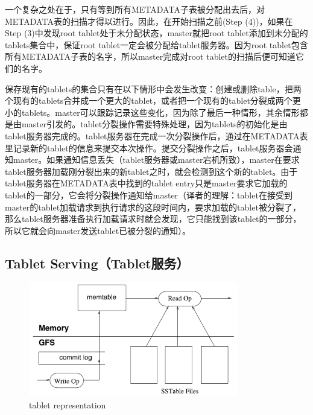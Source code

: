 \documentclass{article}
\begin{document}
\par
一个复杂之处在于，只有等到所有METADATA子表被分配出去后，对METADATA表的扫描才得以进行。因此，在开始扫描之前(Step (4))，如果在Step (3)中发现root tablet处于未分配状态，master就把root tablet添加到未分配的tablets集合中，保证root tablet一定会被分配给tablet服务器。因为root tablet包含所有METADATA子表的名字，所以master完成对root tablet的扫描后便可知道它们的名字。\par
保存现有的tablets的集合只有在以下情形中会发生改变：创建或删除table，把两个现有的tablets合并成一个更大的tablet，或者把一个现有的tablet分裂成两个更小的tablets。master可以跟踪记录这些变化，因为除了最后一种情形，其余情形都是由master引发的。tablet分裂操作需要特殊处理，因为tablets的初始化是由tablet服务器完成的。tablet服务器在完成一次分裂操作后，通过在METADATA表里记录新的tablet的信息来提交本次操作。提交分裂操作之后，tablet服务器会通知master。如果通知信息丢失（tablet服务器或master宕机所致），master在要求tablet服务器加载刚分裂出来的新tablet之时，就会检测到这个新的tablet。由于tablet服务器在METADATA表中找到的tablet entry只是master要求它加载的tablet的一部分，它会将分裂操作通知给master（译者的理解：tablet在接受到master的tablet加载请求到执行请求的这段时间内，要求加载的tablet被分裂了，那么tablet服务器准备执行加载请求时就会发现，它只能找到该tablet的一部分，所以它就会向master发送tablet已被分裂的通知）。

\subsection{Tablet Serving（Tablet服务）}
\begin{figure}[htbp]
    \centering\includegraphics[height=5cm]{images/tablet_representation.png}
    \caption{tablet representation}
    \label{fig:tablet_representation}
\end{figure}
\end{document}
